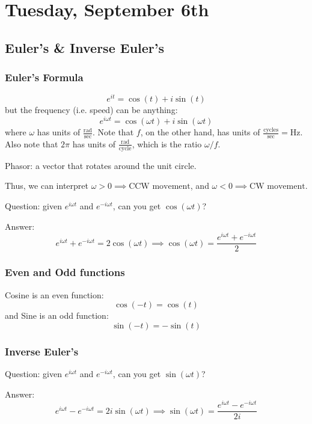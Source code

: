 \section{Tuesday, September 6th}
\subsection{Euler's \& Inverse Euler's}
\subsubsection{Euler's Formula}
\[
    e^{it} = \cos(t)+i\sin(t)
\]
but the frequency (i.e. speed) can be anything:
\[
    e^{i\omega t} = \cos(\omega t)+i\sin(\omega t)
\]
where $\omega$ has units of $\frac{\text{rad}}{\text{sec}}$. Note that $f$, on the other hand, has units of $\frac{\text{cycles}}{\text{sec}}=\text{Hz}$. Also note that $2\pi$ has units of $\frac{\text{rad}}{\text{cycle}}$, which is the ratio $\omega/f$.

\begin{shaded}
Phasor: a vector that rotates around the unit circle. 

Thus, we can interpret $\omega > 0 \implies \text{CCW movement}$, and $\omega < 0 \implies \text{CW movement}$.
\end{shaded}

\begin{shaded}
Question: given $e^{i\omega t}$ and $e^{-i\omega t}$, can you get $\cos(\omega t)$?

Answer:
\[
    e^{i\omega t} + e^{-i\omega t} = 2\cos(\omega t)
    \implies
    \boxed{\cos(\omega t)=\frac{e^{i\omega t} + e^{-i\omega t}}{2}}
\]
\end{shaded}

\subsubsection{Even and Odd functions}

Cosine is an even function:
\[
    \cos(-t) = \cos(t)
\]
and Sine is an odd function:
\[
    \sin(-t) = -\sin(t)
\]

\subsubsection{Inverse Euler's}
\begin{shaded}
Question: given $e^{i\omega t}$ and $e^{-i\omega t}$, can you get $\sin(\omega t)$?

Answer:
\[
    e^{i\omega t} - e^{-i\omega t} = 2i\sin(\omega t)
    \implies
    \boxed{\sin(\omega t)=\frac{e^{i\omega t} - e^{-i\omega t}}{2i}}
\]
\end{shaded}

